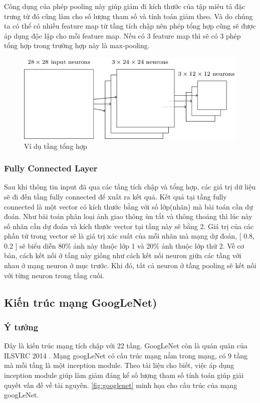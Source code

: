 		Công dụng của phép pooling này giúp giảm đi kích thước của tập miêu tả đặc trưng từ đó cũng làm cho số lượng tham số và tính toán giảm theo. Và do chúng ta có thể có nhiều feature map từ tầng tích chập nên phép tổng hợp cũng sẽ được áp dụng độc lập cho mỗi feature map. Nếu có 3 feature map thì sẽ có 3 phép tổng hợp trong trường hợp này là max-pooling.
		
		\begin{figure}[h!]
			\centering
			\includegraphics[scale=0.5]{charts/pooling_ex.png}
			\caption{Ví dụ tầng tổng hợp \cite{conv-layer}}
			\label{fig:pooling_ex}
		\end{figure}
		
	
	\subsubsection{Fully Connected Layer}
		Sau khi thông tin input đã qua các tầng tích chập và tổng hợp, các giá trị dữ liệu sẽ đi đến tầng fully connected để xuất ra kết quả. Kết quả tại tầng fully connected là một vector có kích thước bằng với số lớp(nhãn) mà bài toán cần dự đoán. Như bài toán phân loại ảnh giao thông ùn tắt và thông thoáng thì lúc này số nhãn cần dự đoán và kích thước vector tại tầng này sẽ bằng 2. Giá trị của các phần tử trong vector sẽ là giá trị xác suất của mỗi nhãn mà mạng dự đoán, [ 0.8, 0.2 ] sẽ biểu diễn 80\% ảnh này thuộc lớp 1 và 20\% ảnh thuộc lớp thứ 2. Về cơ bản, cách kết nối ở tầng này giống như cách kết nối neuron giữa các tầng với nhau ở mạng neuron ở mục trước. Khi đó, tất cả neuron ở tầng pooling sẽ kết nối với từng neuron trong tầng cuối.
	
\subsection{Kiến trúc mạng GoogLeNet)}
	
	\subsubsection{Ý tưởng}
	Đây là kiến trúc mạng tích chập với 22 tầng. GoogLeNet còn là quán quân của ILSVRC 2014 \cite{1}. Mạng googLeNet có cấu trúc mạng nằm trong mạng, có 9 tầng mà mỗi tầng là một inception module. Theo tài liệu cho biết, việc áp dụng inception module giúp làm giảm đáng kể số lượng tham số tính toán giúp giải quyết vấn đề về tài nguyên. \ref{fig:googlenet} minh họa cho cấu trúc của mạng googLeNet.
	
